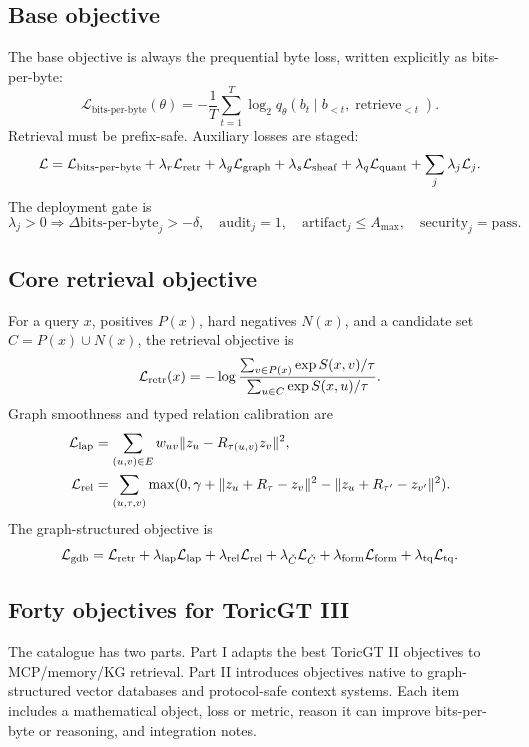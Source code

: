 \documentclass[11pt]{article}
\newcommand{\bitsperbyte}{\mathrm{bits\mbox{-}per\mbox{-}byte}}
\newcommand{\loss}{\mathcal{L}}
\numberwithin{equation}{section}
\begin{document}
\subsection{Base objective}
The base objective is always the prequential byte loss, written explicitly as bits-per-byte:
\begin{equation}
\loss_{\bitsperbyte}(\theta)=-\frac1T\sum_{t=1}^T\log_2 q_\theta(b_t\mid b_{<t},\operatorname{retrieve}_{<t}).
\end{equation}
Retrieval must be prefix-safe. Auxiliary losses are staged:
\begin{equation}
\loss=\loss_{\bitsperbyte}+\lambda_r\loss_{\rm retr}+\lambda_g\loss_{\rm graph}+\lambda_s\loss_{\rm sheaf}+\lambda_q\loss_{\rm quant}+\sum_j\lambda_j\loss_j.
\end{equation}
The deployment gate is
\begin{equation}
\lambda_j>0\Rightarrow \Delta\bitsperbyte_j> -\delta,\quad \mathrm{audit}_j=1,\quad \mathrm{artifact}_j\le A_{\max},\quad \mathrm{security}_j=\mathrm{pass}.
\end{equation}

\subsection{Core retrieval objective}
For a query $x$, positives $P(x)$, hard negatives $N(x)$, and a candidate set $C=P(x)\cup N(x)$, the retrieval objective is
\begin{equation}
\loss_{\rm retr}(x)=-\log \frac{\sum_{v\in P(x)}\exp S(x,v)/\tau}{\sum_{u\in C}\exp S(x,u)/\tau}.
\end{equation}
Graph smoothness and typed relation calibration are
\begin{align}
\loss_{\rm lap}&=\sum_{(u,v)\in E}w_{uv}\|z_u-R_{\tau(u,v)}z_v\|^2,\\
\loss_{\rm rel}&=\sum_{(u,\tau,v)}\max(0,\gamma+\|z_u+R_\tau-z_v\|^2-\|z_u+R_{\tau'}-z_{v'}\|^2).
\end{align}
The graph-structured objective is
\begin{equation}
\loss_{\rm gdb}=\loss_{\rm retr}+\lambda_{\rm lap}\loss_{\rm lap}+\lambda_{\rm rel}\loss_{\rm rel}+\lambda_{\check C}\loss_{\check C}+\lambda_{\rm form}\loss_{\rm form}+\lambda_{\rm tq}\loss_{\rm tq}.
\end{equation}

\subsection{Forty objectives for ToricGT III}
The catalogue has two parts. Part I adapts the best ToricGT II objectives to MCP/memory/KG retrieval. Part II introduces objectives native to graph-structured vector databases and protocol-safe context systems. Each item includes a mathematical object, loss or metric, reason it can improve bits-per-byte or reasoning, and integration notes.
\end{document}
